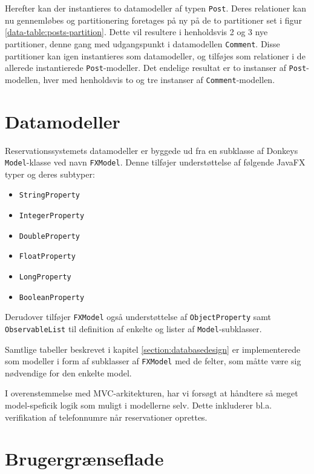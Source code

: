 Herefter kan der instantieres to datamodeller af typen \texttt{Post}. Deres relationer kan nu gennemløbes og partitionering foretages på ny på de to partitioner set i figur \ref{data-table:posts-partition}. Dette vil resultere i henholdsvis 2 og 3 nye partitioner, denne gang med udgangspunkt i datamodellen \texttt{Comment}. Disse partitioner kan igen instantieres som datamodeller, og tilføjes som relationer i de allerede instantierede \texttt{Post}-modeller. Det endelige resultat er to instanser af \texttt{Post}-modellen, hver med henholdsvis to og tre instanser af \texttt{Comment}-modellen.

\section{Datamodeller}

Reservationssystemets datamodeller er byggede ud fra en subklasse af Donkeys \texttt{Model}-klasse ved navn \texttt{FXModel}. Denne tilføjer understøttelse af følgende JavaFX typer og deres subtyper:

\begin{multicols}{3}
\begin{itemize}
  \item \texttt{StringProperty}
  \item \texttt{IntegerProperty}
  \item \texttt{DoubleProperty}
  \item \texttt{FloatProperty}
  \item \texttt{LongProperty}
  \item \texttt{BooleanProperty}
\end{itemize}
\end{multicols}

Derudover tilføjer \texttt{FXModel} også understøttelse af \texttt{ObjectProperty} samt \texttt{ObservableList} til definition af enkelte og lister af \texttt{Model}-subklasser.

Samtlige tabeller beskrevet i kapitel \ref{section:databasedesign} er implementerede som modeller i form af subklasser af \texttt{FXModel} med de felter, som måtte være sig nødvendige for den enkelte model.

I overenstemmelse med MVC-arkitekturen, har vi forsøgt at håndtere så meget model-speficik logik som muligt i modellerne selv. Dette inkluderer bl.a. verifikation af telefonnumre når reservationer oprettes.

\section{Brugergrænseflade}


